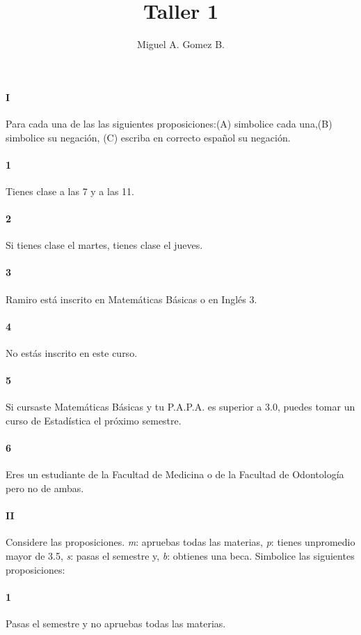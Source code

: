 \documentclass{article}
\title{Taller 1}
\author{Miguel A. Gomez B.}
\begin{document}
	\maketitle
	
	\paragraph{I} Para cada una de las las siguientes proposiciones:(A) simbolice cada una,(B) simbolice su negación, (C) escriba en correcto español su negación.
	\paragraph{1} Tienes clase a las 7 y a las 11.
	\paragraph{2} Si tienes clase el martes, tienes clase el jueves.
	\paragraph{3} Ramiro está inscrito en Matemáticas Básicas o en Inglés 3.
	\paragraph{4} No estás inscrito en este curso.
	\paragraph{5} Si cursaste Matemáticas Básicas y tu P.A.P.A. es superior a 3.0, puedes tomar un curso de Estadística el próximo semestre.
	\paragraph{6} Eres un estudiante de la Facultad de Medicina o de la Facultad de Odontología pero no de ambas.
	\paragraph{II} Considere las proposiciones. \textit{m}: apruebas todas las materias, \textit{p}: tienes unpromedio mayor de 3.5, \textit{s}: pasas el semestre y, \textit{b}: obtienes una beca. Simbolice las siguientes proposiciones:
	\paragraph{1} Pasas el semestre y no apruebas todas las materias.
\end{document}
